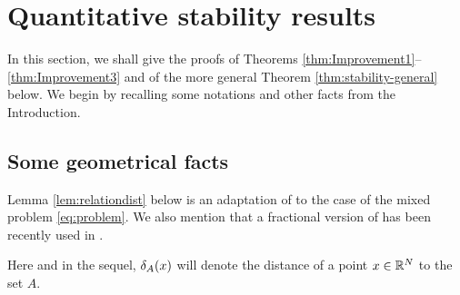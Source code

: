 \documentclass[a4paper,10pt]{amsart}
\numberwithin{equation}{section}
\begin{document}
\section{Quantitative stability results}
\label{sec:stability}

In this section, we shall give the proofs of Theorems \ref{thm:Improvement1}--\ref{thm:Improvement3} and of the more general Theorem \ref{thm:stability-general} below. We begin by recalling some notations and other facts from the Introduction.

\subsection{Some geometrical facts}

Lemma \ref{lem:relationdist} below is an adaptation of \cite[Lemma 3.1]{MP2} to the case of the mixed problem \eqref{eq:problem}.
We also mention that a fractional version of \cite[Lemma 3.1]{MP2} has been recently used in \cite{CDPPV}.

%
Here and in the sequel, $\delta_A(x)$ will denote the distance of a point $x\in\mathbb{R}^N$ to the set $A$.
\end{document}
